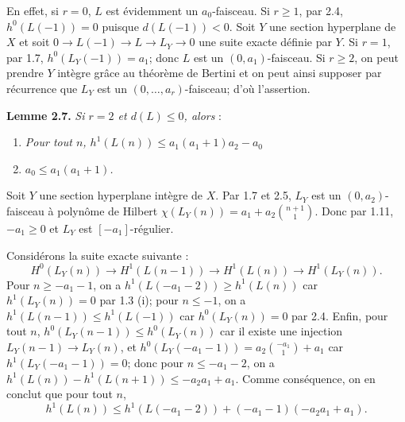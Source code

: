 
En
effet, si \(r=0\), \(L\) est évidemment un \(a_0\)-faisceau. Si \(r\ge1\), par 2.4, \(h^0(L(-1))=0\) puisque \(d(L(-1))<0\). Soit \(Y\) une section hyperplane de \(X\) et soit \(0\longrightarrow L(-1)\longrightarrow L\longrightarrow L_Y\longrightarrow0\) une suite exacte définie par \(Y\). Si \(r=1\), par 1.7, \(h^0(L_Y(-1))=a_1\); donc \(L\) est un \((0,a_1)\)-faisceau. Si \(r\ge2\), on peut prendre \(Y\) intègre grâce au théorème de Bertini et on peut ainsi supposer par récurrence que \(L_Y\) est un \((0,\ldots,a_r)\)-faisceau; d'où l'assertion.

\textbf{Lemme 2.7.} \emph{Si \(r=2\) et \(d(L)\le0\), alors} :
\begin{enumerate}[label=(\roman*)]
\item \emph{Pour tout \(n\), \(h^1(L(n))\le a_1(a_1+1)a_2-a_0\)}
\item \emph{\(a_0\le a_1(a_1+1)\).}
\end{enumerate}

Soit \(Y\) une section hyperplane intègre de \(X\). Par 1.7 et 2.5, \(L_Y\) est un \((0,a_2)\)-faisceau à polynôme de Hilbert \(\chi(L_Y(n))=a_1+a_2\binom{n+1}{1}\). Donc par 1.11, \(-a_1\ge0\) et \(L_Y\) est \([-a_1]\)-régulier.

Considérons la suite exacte suivante :
\[
H^0(L_Y(n))\longrightarrow H^1(L(n-1))
\longrightarrow H^1(L(n))\longrightarrow H^1(L_Y(n)).
\]
Pour \(n\ge -a_1-1\), on a \(h^1(L(-a_1-2))\ge h^1(L(n))\) car \(h^1(L_Y(n))=0\) par 1.3 (i); pour \(n\le -1\), on a \(h^1(L(n-1))\le h^1(L(-1))\) car \(h^0(L_Y(n))=0\) par 2.4. Enfin, pour tout \(n\), \(h^0(L_Y(n-1))\le h^0(L_Y(n))\) car il existe une injection \(L_Y(n-1)\longrightarrow L_Y(n)\), et \(h^0(L_Y(-a_1-1))=a_2\binom{-a_1}{1}+a_1\) car \(h^1(L_Y(-a_1-1))=0\); donc pour \(n\le -a_1-2\), on a \(h^1(L(n))-h^1(L(n+1))\le -a_2a_1+a_1\). Comme conséquence, on en conclut que pour tout \(n\),
\[
h^1(L(n))\le h^1(L(-a_1-2))+(-a_1-1)(-a_2a_1+a_1).
\tag{2.7.1}
\]

